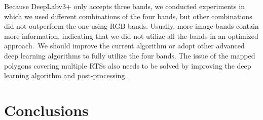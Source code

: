 \documentclass[authoryear,preprint,review,12pt]{elsarticle}
\begin{document}
 Because DeepLabv3+ only accepts three bands, we conducted experiments in which we used different combinations of the four bands, but other combinations did not outperform the one using RGB bands. Usually, more image bands contain more information, indicating that we did not utilize all the bands in an optimized approach.~We should improve the current algorithm or adopt other advanced deep learning algorithms to fully utilize the four bands.
The issue of the mapped polygons covering multiple RTSs also needs to be solved by improving the deep learning algorithm and post-processing. 



\section{Conclusions}
\label{sec_conclusion}
\end{document}
